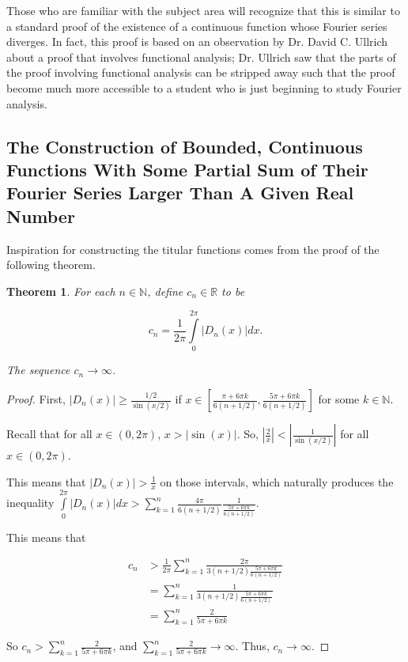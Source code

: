 \documentclass{amsart}
\newcommand{\N}{\mathbb{N}}
\newcommand{\R}{\mathbb{R}}
\newcommand{\absval}[1]{\left| #1 \right|}
\newtheorem{thm}{Theorem}[section]
\theoremstyle{definition}
\begin{document}
Those who are familiar with the subject area will recognize that this is similar to a standard proof of the existence of a continuous function whose Fourier series diverges. 
In fact, this proof is based on an observation by Dr. David C. Ullrich about a proof that involves functional analysis; 
Dr. Ullrich saw that the parts of the proof involving functional analysis can be stripped away such that the proof become much more accessible to a student who is just beginning to study Fourier analysis.

\subsection{The Construction of Bounded, Continuous Functions With Some Partial Sum of Their Fourier Series Larger Than A Given Real Number}\hspace*{\fill}

Inspiration for constructing the titular functions comes from the proof of the following theorem.

\begin{thm}
For each $n \in \N$, define $c_n \in \R$ to be

\begin{displaymath}
c_n = \frac{1}{2 \pi} \int\limits_0^{2\pi} \absval{D_n(x)} dx.
\end{displaymath}

The sequence $c_n \to \infty$.
\end{thm}

\begin{proof}

First, $\absval{D_n(x)} \geq \frac{1/2}{\sin(x/2)}$ if $x \in [\frac{\pi +6\pi k}{6(n+1/2)},\frac{5 \pi+6\pi k}{6(n+1/2)}]$ for some $k \in \N$.

Recall that for all $x \in (0, 2\pi)$, $x > \absval{\sin(x)}$. 
So, $\absval{\frac{2}{x}} < \absval{\frac{1}{\sin(x/2)}}$ for all $x \in (0,2\pi)$.

This means that $\absval{D_n(x)} > \frac{1}{x}$ on those intervals, which naturally produces the inequality $\int\limits_0^{2\pi} \absval{D_n(x)} dx > \sum\limits_{k=1}^n \frac{4 \pi}{6(n+1/2)}\frac{1}{ \frac{5\pi + 6\pi k}{6(n+1/2)}}$. 

This means that 

\begin{align*}
c_n &> \frac{1}{2 \pi} \sum\limits_{k=1}^n \frac{2 \pi}{3(n+1/2) \frac{5 \pi+6\pi k}{6(n+1/2)}}\\
&= \sum\limits_{k=1}^n \frac{1}{3(n+1/2) \frac{5 \pi+6\pi k}{6(n+1/2)}}\\
&= \sum\limits_{k=1}^n \frac{2}{5 \pi+6\pi k}
\end{align*}

So $c_n > \sum\limits_{k=1}^n \frac{2}{5 \pi+6\pi k}$, and $\sum\limits_{k=1}^n \frac{2}{5 \pi+6\pi k} \to \infty$. 
Thus, $c_n \to \infty$.

\end{proof}
\end{document}
